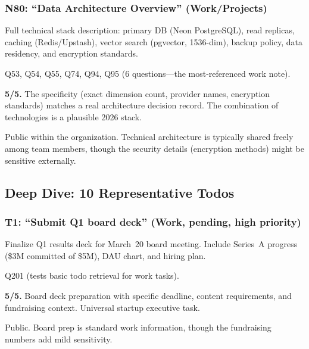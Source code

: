\subsubsection*{N80: ``Data Architecture Overview'' (Work/Projects)}

\begin{description}[nosep,leftmargin=1.5cm]
    \item[Content:] Full technical stack description: primary DB (Neon PostgreSQL), read replicas, caching (Redis/Upstash), vector search (pgvector, 1536-dim), backup policy, data residency, and encryption standards.
    \item[Referenced by:] Q53, Q54, Q55, Q74, Q94, Q95 (6 questions---the most-referenced work note).
    \item[Realism:] \textbf{5/5.} The specificity (exact dimension count, provider names, encryption standards) matches a real architecture decision record. The combination of technologies is a plausible 2026 stack.
    \item[Privacy:] Public within the organization. Technical architecture is typically shared freely among team members, though the security details (encryption methods) might be sensitive externally.
\end{description}

\subsection{Deep Dive: 10 Representative Todos}
\label{sec:deep-dive-todos}

\subsubsection*{T1: ``Submit Q1 board deck'' (Work, pending, high priority)}

\begin{description}[nosep,leftmargin=1.5cm]
    \item[Description:] Finalize Q1 results deck for March~20 board meeting. Include Series~A progress (\$3M committed of \$5M), DAU chart, and hiring plan.
    \item[Referenced by:] Q201 (tests basic todo retrieval for work tasks).
    \item[Realism:] \textbf{5/5.} Board deck preparation with specific deadline, content requirements, and fundraising context. Universal startup executive task.
    \item[Privacy:] Public. Board prep is standard work information, though the fundraising numbers add mild sensitivity.
\end{description}

